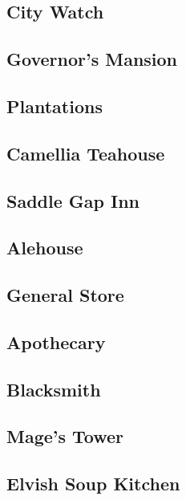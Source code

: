 

\subsection{City Watch}


\subsection{Governor's Mansion}


\subsection{Plantations}


\subsection{Camellia Teahouse}


\subsection{Saddle Gap Inn}


\subsection{Alehouse}


\subsection{General Store}


\subsection{Apothecary}


\subsection{Blacksmith}


\subsection{Mage's Tower}


\subsection{Elvish Soup Kitchen}

